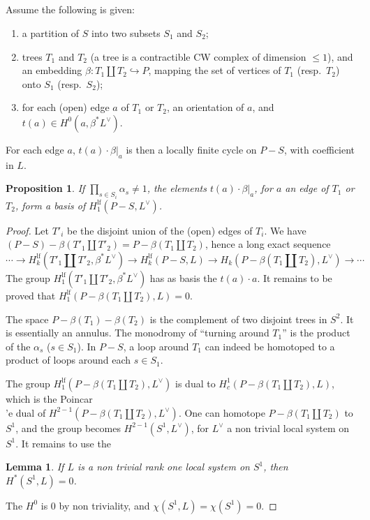 \documentclass[12pt,a4paper]{article}
\theoremstyle{plain}
\newtheorem{lemma}[theorem]{Lemma}
\newtheorem{proposition}[theorem]{Proposition}
\theoremstyle{definition}
\theoremstyle{remark}
\numberwithin{equation}{section}
\begin{document}
\subsection{}
Assume the following is given:
\begin{enumerate}[label=\alph*)]
\item a partition of $S$ into two subsets $S_1$ and $S_2$;
\item trees $T_1$ and $T_2$ (a tree is a contractible CW complex of dimension $\leq 1$), and an embedding $\beta: T_1 \amalg T_2 \hookrightarrow P$, mapping the set of vertices of $T_1$ (resp.\ $T_2$) onto $S_1$ (resp.\ $S_2$);
\item for each (open) edge $a$ of $T_1$ or $T_2$, an orientation of $a$, and $t(a) \in H^0(a, \beta^*L^\vee)$.
\end{enumerate}
For each edge $a$, $t(a) \cdot \beta|_a$ is then a locally finite cycle on $P-S$, with coefficient in $L$.

\begin{proposition}\label{prop:2.5.1}
If $\prod_{s \in S_i} \alpha_s \neq 1$, the elements $t(a) \cdot \beta|_a$, for $a$ an edge of $T_1$ or $T_2$, form a basis of $H^{\mathrm{lf}}_1(P-S, L^\vee)$.
\end{proposition}

\begin{proof}
Let $T'_i$ be the disjoint union of the (open) edges of $T_i$. We have $(P-S) - \beta(T'_1 \amalg T'_2) = P - \beta(T_1 \amalg T_2)$, hence a long exact sequence
\[
\cdots \to H^{\mathrm{lf}}_k(T'_1 \amalg T'_2, \beta^*L^\vee) \to H^{\mathrm{lf}}_k(P-S, L) \to H_k(P - \beta(T_1 \amalg T_2), L^\vee) \to \cdots
\]
The group $H^{\mathrm{lf}}_1(T'_1 \amalg T'_2, \beta^*L^\vee)$ has as basis the $t(a) \cdot a$. It remains to be proved that $H^{\mathrm{lf}}_1(P - \beta(T_1 \amalg T_2), L) = 0$.

The space $P - \beta(T_1) - \beta(T_2)$ is the complement of two disjoint trees in $S^2$. It is essentially an annulus. The monodromy of ``turning around $T_1$'' is the product of the $\alpha_s$ ($s \in S_1$). In $P-S$, a loop around $T_1$ can indeed be homotoped to a product of loops around each $s \in S_1$.

The group $H^{\mathrm{lf}}_1(P - \beta(T_1 \amalg T_2), L^\vee)$ is dual to $H^1_c(P - \beta(T_1 \amalg T_2), L)$, which is the Poincar\\'e dual of $H^{2-1}(P - \beta(T_1 \amalg T_2), L^\vee)$. One can homotope $P - \beta(T_1 \amalg T_2)$ to $S^1$, and the group becomes $H^{2-1}(S^1, L^\vee)$, for $L^\vee$ a non trivial local system on $S^1$. It remains to use the
\begin{lemma}
If $L$ is a non trivial rank one local system on $S^1$, then $H^*(S^1, L) = 0$.
\end{lemma}
The $H^0$ is $0$ by non triviality, and $\chi(S^1, L) = \chi(S^1) = 0$.
\end{proof}
\end{document}
